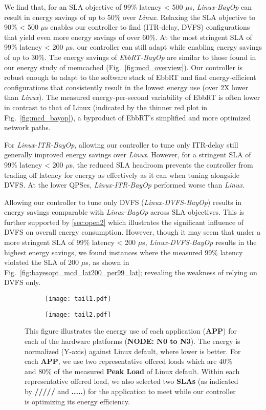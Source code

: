 We find that, for an SLA objective of 99\% latency < 500 $\mu$s, \textit{Linux-BayOp} can result in energy savings of up to 50\% over \textit{Linux}. Relaxing the SLA objective to 90\% < 500 $\mu$s enables our controller to find (ITR-delay,  DVFS) configurations that yield even more energy savings of over 60\%. At the most stringent SLA of 99\% latency < 200 $\mu$s, our controller can still adapt while enabling energy savings of up to 30\%. 
The energy savings of \textit{EbbRT-BayOp} are similar to those found in our energy study of memcached (Fig.~\ref{fig:mcd_overview}). Our controller is robust enough to adapt to the software stack of EbbRT and find energy-efficient configurations that consistently result in the lowest energy use (over 2X lower than \textit{Linux}). The measured energy-per-second variability of EbbRT is often lower in contrast to that of Linux (indicated by the thinner red plot in Fig.~\ref{fig:mcd_bayop}), a byproduct of EbbRT's simplified and more optimized network paths.

For \textit{Linux-ITR-BayOp}, allowing our controller to tune only ITR-delay still generally improved energy savings over \textit{Linux}. However, for a stringent SLA of 99\% latency < 200 $\mu$s, the reduced SLA headroom prevents the controller from trading off latency for energy as effectively as it can when tuning alongside DVFS. At the lower QPSes, \textit{Linux-ITR-BayOp} performed worse than \textit{Linux}.

Allowing our controller to tune only DVFS (\textit{Linux-DVFS-BayOp}) results in energy savings comparable with \textit{Linux-BayOp} across SLA objectives. This is further supported by \ref{sec:open2} which illustrates the significant influence of DVFS on overall energy consumption. However, though it may seem that under a more stringent SLA of 99\% latency < 200 $\mu$s, \textit{Linux-DVFS-BayOp} results in the highest energy savings, we found instances where the measured 99\% latency violated the SLA of 200 $\mu$s, as shown in Fig.~\ref{fig:bayesopt_mcd_lat200_per99_lat}; revealing the weakness of relying on DVFS only.

\begin{figure*}[!htb]
\begin{subfigure}{\textwidth}
  \texttt{[image: tail1.pdf]}
\end{subfigure}
\begin{subfigure}{\textwidth}
  \texttt{[image: tail2.pdf]}
\end{subfigure}
\caption{\small This figure illustrates the energy use of each application (\textbf{APP}) for each of the hardware platforms (\textbf{NODE: N0 to N3}). The energy is normalized (Y-axis) against Linux default, where lower is better. For each \textbf{APP}, we use two representative offered loads which are 40\% and 80\% of the measured \textbf{Peak Load} of Linux default. Within each representative offered load, we also selected two \textbf{SLAs} (as indicated by \textbf{/////} and \textbf{.....}) for the application to meet while our controller is optimizing its energy efficiency.}
\label{fig:xl170}
\vspace{-0.1in}
\end{figure*}
